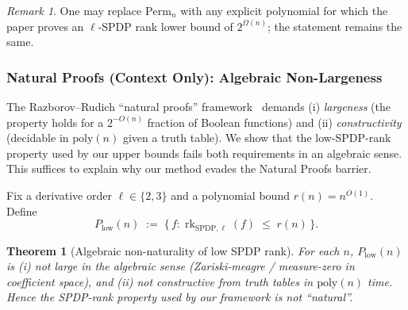 \documentclass[12pt]{article}
\newtheorem{theorem}{Theorem}
\theoremstyle{definition}
\theoremstyle{definition}
\theoremstyle{remark}
\newtheorem{remark}{Remark}
\theoremstyle{remark}
\begin{document}
\begin{remark}\label{rem:oracle-variants}
One may replace $\mathrm{Perm}_n$ with any explicit polynomial for which the paper proves an $\ell$-SPDP rank lower bound of $2^{\Omega(n)}$; the statement remains the same.
\end{remark}

\subsubsection{Natural Proofs (Context Only): Algebraic Non-Largeness}
\label{subsec:natural-proofs}

The Razborov--Rudich ``natural proofs'' framework~\cite{razborov1997} demands (i) \emph{largeness} (the property holds for a $2^{-O(n)}$ fraction of Boolean functions) and (ii) \emph{constructivity} (decidable in $\mathrm{poly}(n)$ given a truth table). We show that the low-SPDP-rank property used by our upper bounds fails both requirements in an algebraic sense. This suffices to explain why our method evades the Natural Proofs barrier.

Fix a derivative order $\ell \in \{2,3\}$ and a polynomial bound $r(n) = n^{O(1)}$. Define
\[
P_{\mathrm{low}}(n) \;:=\; \{\, f : \operatorname{rk}_{\mathrm{SPDP},\ell}(f) \;\le\; r(n)\,\}.
\]

\begin{theorem}[Algebraic non-naturality of low SPDP rank]\label{thm:spdp-not-natural}
For each $n$, $P_{\mathrm{low}}(n)$ is (i) not large in the algebraic sense (Zariski-meagre / measure-zero in coefficient space), and (ii) not constructive from truth tables in $\mathrm{poly}(n)$ time. Hence the SPDP-rank property used by our framework is not ``natural''.
\end{theorem}
\end{document}
